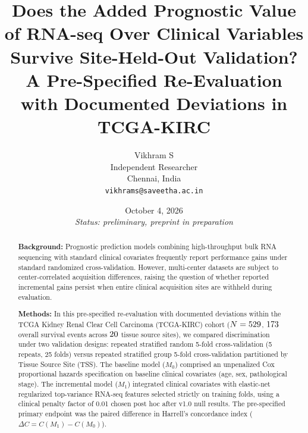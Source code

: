 \documentclass{article}
\title{Does the Added Prognostic Value of RNA-seq Over Clinical Variables Survive Site-Held-Out Validation? A Pre-Specified Re-Evaluation with Documented Deviations in TCGA-KIRC}
\author{
  Vikhram S \\
  Independent Researcher \\
  Chennai, India \\
  \texttt{vikhrams@saveetha.ac.in}
}
\date{October 4, 2026 \\ \textit{Status: preliminary, preprint in preparation}}
\begin{document}
\maketitle

\begin{abstract}
\textbf{Background:} Prognostic prediction models combining high-throughput bulk RNA sequencing with standard clinical covariates frequently report performance gains under standard randomized cross-validation. However, multi-center datasets are subject to center-correlated acquisition differences, raising the question of whether reported incremental gains persist when entire clinical acquisition sites are withheld during evaluation.

\textbf{Methods:} In this pre-specified re-evaluation with documented deviations within the TCGA Kidney Renal Clear Cell Carcinoma (TCGA-KIRC) cohort ($N = 529$, $173$ overall survival events across $20$ tissue source sites), we compared discrimination under two validation designs: repeated stratified random 5-fold cross-validation (5 repeats, 25 folds) versus repeated stratified group 5-fold cross-validation partitioned by Tissue Source Site (TSS). The baseline model ($M_0$) comprised an unpenalized Cox proportional hazards specification on baseline clinical covariates (age, sex, pathological stage). The incremental model ($M_1$) integrated clinical covariates with elastic-net regularized top-variance RNA-seq features selected strictly on training folds, using a clinical penalty factor of 0.01 chosen post hoc after v1.0 null results. The pre-specified primary endpoint was the paired difference in Harrell's concordance index ($\Delta C = C(M_1) - C(M_0)$).


\end{abstract}
\end{document}
